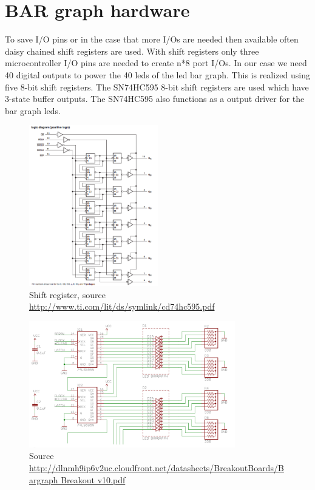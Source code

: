 \section{BAR graph hardware}
To save I/O pins or in the case that more I/Os are needed then available often daisy chained shift registers are used. With shift registers only three microcontroller I/O pins are needed to create n*8 port I/Os. In our case we need 40 digital outputs to power the 40 leds of the led bar graph. This is realized using five 8-bit shift registers. The SN74HC595 8-bit shift registers are used which have 3-state buffer outputs. The SN74HC595 also functions as a output driver for the bar graph leds.

\begin{figure}[H]
   \centering
   \includegraphics[width=0.5\textwidth]{img/Shift_register.png}%
   \caption{Shift register, source \url{http://www.ti.com/lit/ds/symlink/cd74hc595.pdf}}
   \label{fig:shiftRegister}%
\end{figure}


\begin{figure}[H]
   \centering
   \includegraphics[width=0.8\textwidth]{img/Breakout.png}%
   \caption{Source \url{http://dlnmh9ip6v2uc.cloudfront.net/datasheets/BreakoutBoards/Bargraph Breakout v10.pdf}}
   \label{fig:breakout}%
\end{figure}

